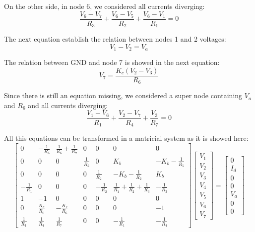 \noindent On the other side, in node 6, we considered all currents diverging:
\begin{equation}
\frac{V_6 - V_7}{R_3} + \frac{V_6 - V_5}{R_2} + \frac{V_6 - V_1}{R_1} = 0
  \label{eq:kvl_node6}
\end{equation}

\noindent The next equation establish the relation between nodes 1 and 2 voltages:
\begin{equation}
V_1 - V_2 = V_a
  \label{eq:kvl_node12}
\end{equation}

\noindent The relation between GND and node 7 is showed in the next equation:
\begin{equation}
V_7 = \frac{K_c(V_2 - V_3)}{R_6}
  \label{eq:kvl_node7GND}
\end{equation}

\noindent Since there is still an equation missing, we considered a super node containing $V_a$ and $R_6$ and all currents diverging:
\begin{equation}
\frac{V_1 - V_6}{R_1} + \frac{V_2 - V_7}{R_4} + \frac{V_3}{R_7} = 0
  \label{eq:kvl_supernode}
\end{equation}

\noindent All this equations can be transformed in a matricial system as it is showed here:
$$ \left[ \begin{array}{ccccccc} 0 & -\frac{1}{R_6} & \frac{1}{R_6} + \frac{1}{R_7} & 0 & 0 & 0 & 0 \\
0 & 0 & 0 & \frac{1}{R_5} & 0 & K_b & -K_b - \frac{1}{R_5} \\
0 & 0 & 0 & 0 & \frac{1}{R_2} & -K_b - \frac{1}{R_2} & K_b
\\ -\frac{1}{R_1} & 0 & 0 & 0 & -\frac{1}{R_2} & \frac{1}{R_1} + \frac{1}{R_2} + \frac{1}{R_3} & -\frac{1}{R_3}
\\ 1 & -1 & 0 & 0 & 0 & 0 & 0
\\ 0 & \frac{K_c}{R_6} & -\frac{K_c}{R_6} & 0 & 0 & 0 & -1
\\ \frac{1}{R_1} & \frac{1}{R_4} & \frac{1}{R_7} & 0 & 0 & -\frac{1}{R_1} & -\frac{1}{R_4}\end{array} \right]
\left[ \begin{array}{c} V_1 \\ V_2 \\ V_3 \\ V_4 \\ V_5 \\ V_6 \\ V_7\end{array} \right] = 
\left[ \begin{array}{c} 0 \\ I_d \\ 0 \\ 0 \\ V_a \\ 0 \\ 0\end{array} \right] $$

